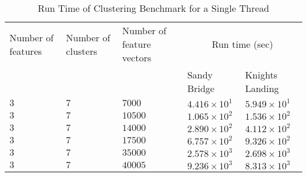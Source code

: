 \begin{table*}
  \caption{Run Time of Clustering Benchmark for a Single Thread}
  \label{tab:clusterResults}
  \begin{tabular}{lllll}
    \toprule
    Number of features & Number of clusters & Number of feature vectors & \multicolumn{2}{c}{Run time (sec)}\\
                       &                    &                           & Sandy Bridge & Knights Landing\\
    \midrule
    $3$ & $7$ & $7000$  & $4.416\times 10^{1}$ & $5.949\times 10^{1}$ \\
    $3$ & $7$ & $10500$ & $1.065\times 10^{2}$ & $1.536\times 10^{2}$ \\
    $3$ & $7$ & $14000$ & $2.890\times 10^{2}$ & $4.112\times 10^{2}$ \\
    $3$ & $7$ & $17500$ & $6.757\times 10^{2}$ & $9.326\times 10^{2}$ \\
    $3$ & $7$ & $35000$ & $2.578\times 10^{3}$ & $2.698\times 10^{3}$ \\
    $3$ & $7$ & $40005$ & $9.236\times 10^{3}$ & $8.313\times 10^{3}$ \\
    \bottomrule
  \end{tabular}
\end{table*}

%

